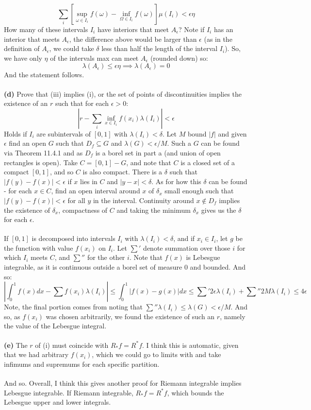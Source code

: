 \documentclass[12pt,a4paper]{article}
\newcommand{\1}[1]{\mathbbm{1}\left\{ #1 \right\}}
\begin{document}
$$
	\sum_i \left[\sup_{\omega \in I_i} f(\omega) - \inf_{\Omega \in I_i} f(\omega)\right] \mu(I_i) < \epsilon\eta
$$
How many of these intervals $I_i$ have interiors that meet $A_\epsilon$? Note if $I_i$ has an interior that meets $A_\epsilon$, the difference above would be larger than $\epsilon$ (as in the definition of $A_\epsilon$, we could take $\delta$ less than half the length of the interval $I_i$). So, we have only $\eta$ of the intervals max can meet $A_\epsilon$ (rounded down) so:
$$
	\lambda(A_\epsilon) \leq \epsilon\eta \implies \lambda(A_\epsilon) = 0
$$
And the statement follows.
\\\\
\textbf{(d)} Prove that (iii) implies (i), or the set of points of discontinuities implies the existence of an $r$ such that for each $\epsilon > 0$:
$$
	\left|r - \sum_i \inf_{x \in I_i} f(x_i)\lambda(I_i)\right| < \epsilon
$$
Holds if $I_i$ are subintervals of $[0,1]$ with $\lambda(I_i) < \delta$. Let $M$ bound $|f|$ and given $\epsilon$ find an open $G$ such that $D_f \subseteq G$ and $\lambda(G) < \epsilon/M$. Such a $G$ can be found via Theorem 11.4.1 and as $D_f$ is a borel set in part a (and union of open rectangles is open). Take $C = [0,1] - G$, and note that $C$ is a closed set of a compact $[0,1]$, and so $C$ is also compact. There is a $\delta$ such that $|f(y) - f(x)| < \epsilon$ if $x$ lies in $C$ and $|y-x| < \delta$. As for how this $\delta$ can be found - for each $x \in C$, find an open interval around $x$ of $\delta_x$ small enough such that $|f(y) - f(x)| < \epsilon$ for all $y$ in the interval. Continuity around $x \not\in D_f$ implies the existence of $\delta_x$, compactness of $C$ and taking the minimum $\delta_x$ gives us the $\delta$ for each $\epsilon$.
\\\\
If $[0,1]$ is decomposed into intervals $I_i$ with $\lambda(I_i) < \delta$, and if $x_i \in I_i$, let $g$ be the function with value $f(x_i)$ on $I_i$. Let $\sum'$ denote summation over those $i$ for which $I_i$ meets $C$, and $\sum''$ for the other $i$. Note that $f(x)$ is Lebesgue integrable, as it is continuous outside a borel set of measure 0 and bounded. And so:
$$
	\left|\int_0^1 f(x) dx - \sum f(x_i)\lambda(I_i)\right| \leq
	\int_0^1 \left|f(x) - g(x)\right| dx \leq
	\sum' 2\epsilon\lambda(I_i) + \sum'' 2M\lambda(I_i) \leq 4\epsilon
$$
Note, the final portion comes from noting that $\sum'' \lambda(I_i) \leq \lambda(G) < \epsilon/M$. And so, as $f(x_i)$ was chosen arbitrarily, we found the existence of such an $r$, namely the value of the Lebesgue integral.
\\\\
\textbf{(e)} The $r$ of (i) must coincide with $R_*f = R^*f$. I think this is automatic, given that we had arbitrary $f(x_i)$, which we could go to limits with and take infimums and supremums for each specific partition.
\\\\
And so. Overall, I think this gives another proof for Riemann integrable implies Lebesgue integrable. If Riemann integrable, $R_*f = R^*f$, which bounds the Lebesgue upper and lower integrals.
\end{document}
